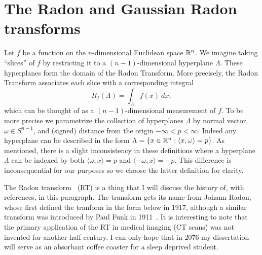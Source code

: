 


\section{The Radon and Gaussian Radon transforms}

Let $f$ be a function on the $n$-dimensional Euclidean space $\mathbb{R}^n$. We imagine taking ``slices'' of $f$ by restricting it to a $(n-1)$-dimensional hyperplane $\Lambda$. These hyperplanes form the domain of the Radon Transform. More precisely, the Radon Transform associates each slice with a corresponding integral
\[
  R_f(\Lambda) = \int_{\Lambda} f(x) ~dx,
\]
which can be thought of as a $(n-1)$-dimensional measurement of $f$. To be more precise we parametrize the collection of hyperplanes $\Lambda$ by normal vector, $\omega \in S^{n-1}$, and (signed) distance from the origin $-\infty < p < \infty$. Indeed any hyperplane can be described in the form $\Lambda = \{x \in \mathbb{R}^n: \langle x, \omega\rangle = p\}$. As mentioned, there is a slight inconsistency in these definitions where a hyperplane $\Lambda$ can be indexed by both $\langle \omega, x \rangle = p$ and $\langle -\omega, x \rangle = -p$. This difference is inconsequential for our purposes so we choose the latter definition for clarity.

The Radon transform~\cite{Helg65} (RT) is a thing that I will discuss the history of, with references, in this paragraph. The transform gets its name from Johann Radon, whose first defined the tranform in the form below in 1917, although a similar transform was introduced by Paul Funk in 1911~\cite{????}. It is interesting to note that the primary application of the RT in medical imaging (CT scans) was not invented for another half century. I can only hope that in 2076 my dissertation will serve as an absorbant coffee coaster for a sleep deprived student.

